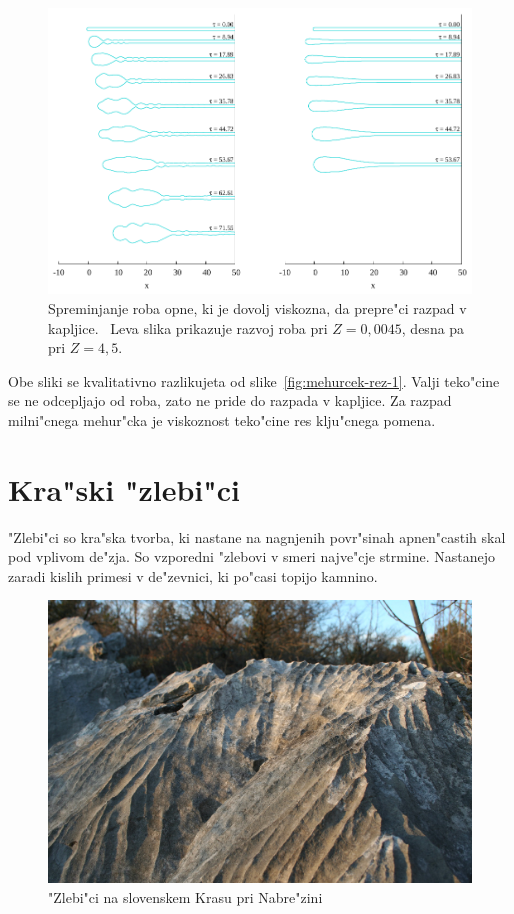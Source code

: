 \documentclass[a4paper,12pt]{article}
\begin{document}
\begin{figure}[h]
  \centering
\includegraphics[width=.9\textwidth]{./Slike/scat-rezultat-1}
\caption{Spreminjanje roba opne, ki je dovolj viskozna, da prepre"ci razpad v kapljice.~\cite{scat}
Leva slika prikazuje razvoj roba pri $Z=0,0045$, desna pa pri $Z=4,5$. }
\label{fig:mehurcek-rez-vis-1}
\end{figure}

Obe sliki se kvalitativno razlikujeta od slike~\ref{fig:mehurcek-rez-1}. Valji teko"cine se ne odcepljajo od roba, zato ne pride do razpada v kapljice. Za razpad milni"cnega mehur"cka je viskoznost teko"cine res klju"cnega pomena. 

\clearpage
\section{Kra"ski "zlebi"ci}

"Zlebi"ci so kra"ska tvorba, ki nastane na nagnjenih povr"sinah apnen"castih skal pod vplivom de"zja. So vzporedni "zlebovi v smeri najve"cje strmine. Nastanejo zaradi kislih primesi v de"zevnici, ki po"casi topijo kamnino. 

\begin{figure}[h]
\centering
 \includegraphics[width=.8\textwidth]{./Slike/Zlebici}
 \caption{"Zlebi"ci na slovenskem Krasu pri Nabre"zini~\cite{wiki:zlebic} }
 \label{fig:zlebici-slika}
\end{figure}
\end{document}
